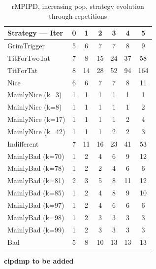 \documentclass[journal,a4paper,10pt,twoside]{IEEEtran} %
\begin{document}
\begin{table}[ht]
	\caption{rMPIPD, increasing pop, strategy evolution through repetitions}
	\label{tab:ripdmp-incr}
	\centering
	\begin{tabular}{l|cccccc} \toprule
		Strategy --- Iter & 0 &  1 &  2 &  3 &  4 &   5 \\ \midrule
		GrimTrigger       & 5 &  6 &  7 &  7 &  8 &   9 \\
		TitForTwoTat      & 7 &  8 & 15 & 24 & 37 &  58 \\
		TitForTat         & 8 & 14 & 28 & 52 & 94 & 164 \\
		Nice              & 6 &  6 &  7 &  7 &  8 &  11 \\
		MainlyNice (k=3)  & 1 &  1 &  1 &  1 &  1 &   1 \\
		MainlyNice (k=8)  & 1 &  1 &  1 &  1 &  1 &   2 \\
		MainlyNice (k=17) & 1 &  1 &  1 &  1 &  2 &   4 \\
		MainlyNice (k=42) & 1 &  1 &  1 &  2 &  2 &   3 \\
		Indifferent       & 7 & 11 & 16 & 23 & 41 &  53 \\
		MainlyBad (k=70)  & 1 &  2 &  4 &  6 &  9 &  12 \\
		MainlyBad (k=78)  & 1 &  2 &  2 &  4 &  6 &   6 \\
		MainlyBad (k=81)  & 2 &  3 &  5 &  8 & 11 &  12 \\
		MainlyBad (k=85)  & 1 &  2 &  4 &  8 &  9 &  10 \\
		MainlyBad (k=97)  & 1 &  2 &  4 &  6 &  6 &   6 \\
		MainlyBad (k=98)  & 1 &  2 &  3 &  3 &  3 &   3 \\
		MainlyBad (k=99)  & 1 &  2 &  3 &  3 &  3 &   3 \\
		Bad               & 5 &  8 & 10 & 13 & 13 &  13 \\ \bottomrule
	\end{tabular}
\end{table}

\textbf{cipdmp to be added}
\end{document}
